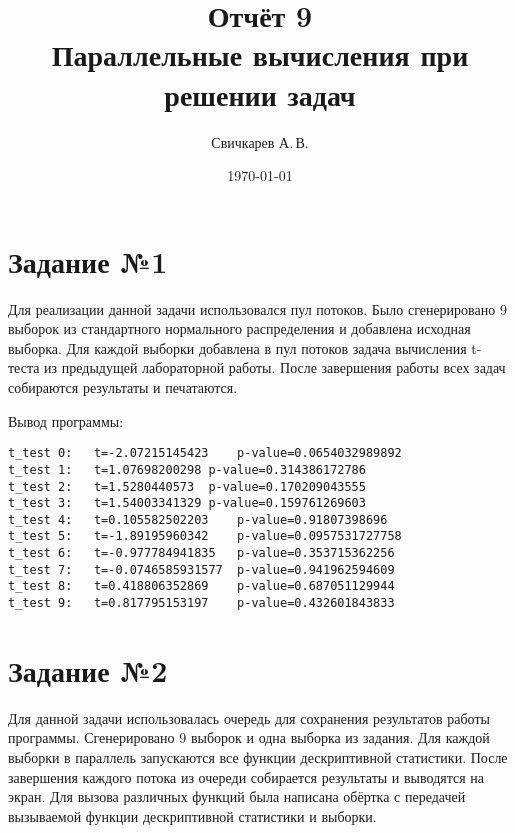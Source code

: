 \documentclass{article} %
\title{Отчёт 9\protect\\Параллельные вычисления при решении задач} %
\author{Свичкарев А.\,В.} %
\date{\today} %
\begin{document}

\maketitle %

\section{Задание №1}
Для реализации данной задачи использовался пул потоков.
Было сгенерировано 9 выборок из стандартного нормального распределения и добавлена исходная выборка. 
Для каждой выборки добавлена в пул потоков задача вычисления t-теста из предыдущей лабораторной работы.
После завершения работы всех задач собираются результаты и печатаются. 



Вывод программы:
\begin{verbatim}
t_test 0:   t=-2.07215145423    p-value=0.0654032989892
t_test 1:   t=1.07698200298 p-value=0.314386172786
t_test 2:   t=1.5280440573  p-value=0.170209043555
t_test 3:   t=1.54003341329 p-value=0.159761269603
t_test 4:   t=0.105582502203    p-value=0.91807398696
t_test 5:   t=-1.89195960342    p-value=0.0957531727758
t_test 6:   t=-0.977784941835   p-value=0.353715362256
t_test 7:   t=-0.0746585931577  p-value=0.941962594609
t_test 8:   t=0.418806352869    p-value=0.687051129944
t_test 9:   t=0.817795153197    p-value=0.432601843833
\end{verbatim}

\newpage
\section{Задание №2}
Для данной задачи использовалась очередь для сохранения результатов работы программы.
Сгенерировано 9 выборок и одна выборка из задания.
Для каждой выборки в параллель запускаются все функции дескриптивной статистики.
После завершения каждого потока из очереди собирается результаты и выводятся на экран.
Для вызова различных функций была написана обёртка с передачей вызываемой функции дескриптивной статистики и выборки.


\end{document}
